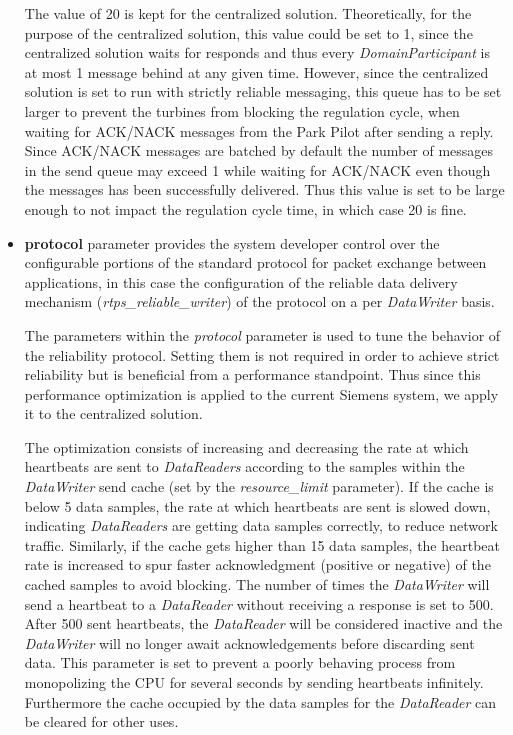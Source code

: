 \begin{itemize}
	The value of 20 is kept for the centralized solution. Theoretically, for the purpose of the centralized solution, this value could be set to 1, since the centralized solution waits for responds and thus every \textit{DomainParticipant} is at most 1 message behind at any given time. However, since the centralized solution is set to run with strictly reliable messaging, this queue has to be set larger to prevent the turbines from blocking the regulation cycle, when waiting for ACK/NACK messages from the Park Pilot after sending a reply. Since ACK/NACK messages are batched by default the number of messages in the send queue may exceed 1 while waiting for ACK/NACK even though the messages has been successfully delivered. Thus this value is set to be large enough to not impact the regulation cycle time, in which case 20 is fine.
	 
	\item \textbf{protocol} parameter provides the system developer control over the configurable portions of the standard protocol for packet exchange between applications, in this case the configuration of the reliable data delivery mechanism (\textit{rtps\_reliable\_writer}) of the protocol on a per \textit{DataWriter} basis. 
	
	The parameters within the \textit{protocol} parameter is used to tune the behavior of the reliability protocol. Setting them is not required in order to achieve strict reliability but is beneficial from a performance standpoint. Thus since this performance optimization is applied to the current Siemens system, we apply it to the centralized solution.
	
	The optimization consists of increasing and decreasing the rate at which heartbeats are sent to \textit{DataReaders} according to the samples within the \textit{DataWriter} send cache (set by the \textit{resource\_limit} parameter). If the cache is below 5 data samples, the rate at which heartbeats are sent is slowed down, indicating \textit{DataReaders} are getting data samples correctly, to reduce network traffic. Similarly, if the cache gets higher than 15 data samples, the heartbeat rate is increased to spur faster acknowledgment (positive or negative) of the cached samples to avoid blocking. The number of times the \textit{DataWriter} will send a heartbeat to a \textit{DataReader} without receiving a response is set to 500. After 500 sent heartbeats, the \textit{DataReader} will be considered inactive and the \textit{DataWriter} will no longer await acknowledgements before discarding sent data. This parameter is set to prevent a poorly behaving process from monopolizing the CPU for several seconds by sending heartbeats infinitely. Furthermore the cache occupied by the data samples for the \textit{DataReader} can be cleared for other uses.
	

\end{itemize}
